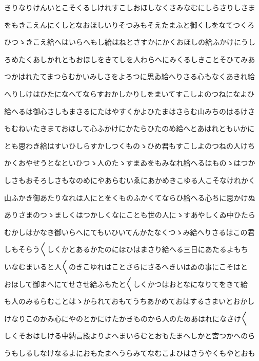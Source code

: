 \documentclass[a4paper,11pt,landscape]{ltjtarticle}
\begin{document}
\par\medskip
きりなりけんいとこそくるしけれすこしおほしなくさみなむにしらさりしさま
\par\medskip
をもきこえんにくしとなおほしいりそつみもそえたまふと御くしをなてつくろ
\par\medskip
ひつゝきこえ給へはいらへもし給はねとさすかにかくおほしの給ふかけにうし
\par\medskip
ろめたくあしかれともおほしをきてしを人わらへにみくるしきことそひてみあ
\par\medskip
つかはれたてまつらむかいみしさをよろつに思ゐ給へりさる心もなくあきれ給
\par\medskip
へりしけはひたになへてならすおかしかりしをまいてすこしよのつねになよひ
\par\medskip
給へるは御心さしもまさるにたはやすくかよひたまはさらむ山みちのはるけさ
\par\medskip
もむねいたきまておほして心ふかけにかたらひたのめ給へとあはれともいかに
\par\medskip
とも思わき給はすいひしらすかしつくものゝひめ君もすこしよのつねの人けち
\par\medskip
かくおやせうとなといひつゝ人のたゝすまゐをもみなれ給へるはものゝはつか
\par\medskip
しさもおそろしさもなのめにやあらむいゑにあかめきこゆる人こそなけれかく
\par\medskip
山ふかき御あたりなれは人にとをくものふかくてならひ給へる心ちに思かけぬ
\par\medskip
ありさまのつゝましくはつかしくなにことも世の人にゝすあやしくゐ中ひたら
\par\medskip
むかしはかなき御いらへにてもいひいてんかたなくつゝみ給へりさるはこの君
\par\medskip
しもそらう〱しくかとあるかたのにほひはまさり給へる三日にあたるよもち
\par\medskip
いなむまいると人〱のきこゆれはことさらにさるへきいはゐの事にこそはと
\par\medskip
おほして御まへにてせさせ給ふもたと〱しくかつはおとなになりてをきて給
\par\medskip
も人のみるらむことはゝかられておもてうちあかめておはするさまいとおかし
\par\medskip
けなりこのかみ心にやのとかにけたかきものから人のためあはれになさけ〱
\par\medskip
しくそおはしける中納言殿よりよへまいらむとおもたまへしかと宮つかへのら
\par\medskip
うもしるしなけなるよにおもたまへうらみてなむこよひはさうやくもやとおも
\par\medskip
\end{document}
